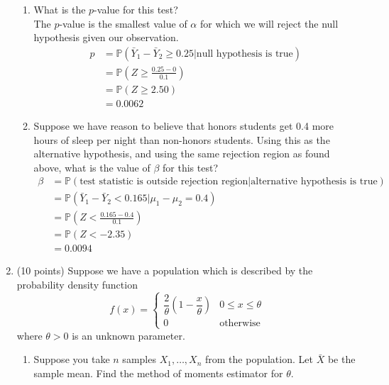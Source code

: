 \documentclass[12pt]{article}
\def\P{{\mathbb P}}
\begin{document}
\begin{enumerate}
\begin{enumerate}
\item What is the $p$-value for this test?\\

The $p$-value is the smallest value of $\alpha$ for which we will reject the null hypothesis given our observation.
\begin{align*}
p &= \P(\bar{Y}_1 - \bar{Y}_2 \geq 0.25 | \text{null hypothesis is true}) \\
&= \P\left( Z \geq \frac{0.25 - 0}{ 0.1 } \right) \\
&= \P(Z \geq 2.50) \\
&= 0.0062
\end{align*}

\item Suppose we have reason to believe that honors students get 0.4 more hours of sleep per night than non-honors students. Using this as the alternative hypothesis, and using the same rejection region as found above, what is the value of $\beta$ for this test?\\

\begin{align*}
\beta &= \P(\text{test statistic is outside rejection region}| \text{alternative hypothesis is true}) \\
&= \P(\bar{Y}_1 - \bar{Y}_2 < 0.165 | \mu_1 - \mu_2 = 0.4 ) \\
&= \P\left(Z < \frac{0.165 - 0.4}{0.1} \right) \\
&= \P(Z < -2.35) \\
&= 0.0094
\end{align*}
\end{enumerate}

\pagebreak

\item (10 points) Suppose we have a population which is described by the probability density function
\[
f(x) = \begin{cases}
\dfrac{2}{\theta} \left( 1 - \dfrac{x}{\theta} \right) & 0 \leq x \leq \theta \\
0 & \text{otherwise}
\end{cases}
\]
where $\theta > 0$ is an unknown parameter.
\begin{enumerate}
\item Suppose you take $n$ samples $X_1, \dots, X_n$ from the population. Let $\bar{X}$ be the sample mean. Find the method of moments estimator for $\theta$.\\


\end{enumerate}
\end{enumerate}
\end{document}
